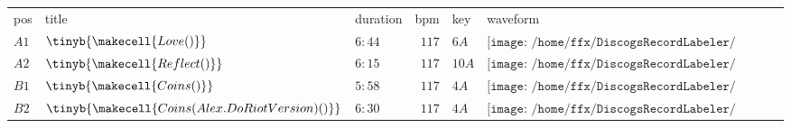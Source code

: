 \begin{tabular}{lllrll}
pos & title & duration & bpm & key & waveform \\
$A1$ & $ \tinyb{\makecell{Love  ()}}$ & $6:44$ & $117$ & $6A$ & $\texttt{[image: /home/ffx/DiscogsRecordLabeler/database/13582634/A1\_waveform.png]}$ \\
$A2$ & $ \tinyb{\makecell{Reflect  ()}}$ & $6:15$ & $117$ & $10A$ & $\texttt{[image: /home/ffx/DiscogsRecordLabeler/database/13582634/A2\_waveform.png]}$ \\
$B1$ & $ \tinyb{\makecell{Coins  ()}}$ & $5:58$ & $117$ & $4A$ & $\texttt{[image: /home/ffx/DiscogsRecordLabeler/database/13582634/B1\_waveform.png]}$ \\
$B2$ & $ \tinyb{\makecell{Coins (Alex.Do Riot Version)  ()}}$ & $6:30$ & $117$ & $4A$ & $\texttt{[image: /home/ffx/DiscogsRecordLabeler/database/13582634/B2\_waveform.png]}$ \\
\end{tabular}
